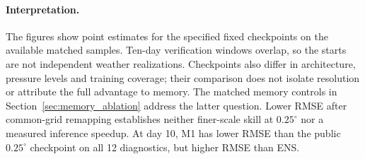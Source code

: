 \paragraph{Interpretation.}
The figures show point estimates for the specified fixed checkpoints on the available matched samples. Ten-day verification windows overlap, so the starts are not independent weather realizations. Checkpoints also differ in architecture, pressure levels and training coverage; their comparison does not isolate resolution or attribute the full advantage to memory. The matched memory controls in Section~\ref{sec:memory_ablation} address the latter question. Lower RMSE after common-grid remapping establishes neither finer-scale skill at $0.25^\circ$ nor a measured inference speedup. At day 10, M1 has lower RMSE than the public $0.25^\circ$ checkpoint on all 12 diagnostics, but higher RMSE than ENS.

\clearpage

